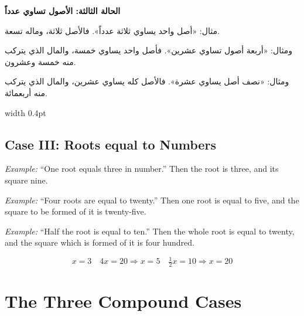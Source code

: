 \documentclass[11pt,a4paper]{book}
\begin{document}
\noindent\begin{minipage}[t]{0.48\textwidth}
\raggedleft

\begin{Arabic}
\textbf{الحالة الثالثة: الأصول تساوي عدداً}

مثال: «أصل واحد يساوي ثلاثة عدداً». فالأصل ثلاثة، وماله تسعة.

ومثال: «أربعة أصول تساوي عشرين». فأصل واحد يساوي خمسة، والمال الذي يتركب منه خمسة وعشرون.

ومثال: «نصف أصل يساوي عشرة». فالأصل كله يساوي عشرين، والمال الذي يتركب منه أربعمائة.
\end{Arabic}

\end{minipage}%
\hfill\vrule width 0.4pt\hfill
\begin{minipage}[t]{0.48\textwidth}
\raggedright

\subsection*{Case III: Roots equal to Numbers}

\textit{Example:} ``One root equals three in number.'' Then the root is three, and its square nine.

\textit{Example:} ``Four roots are equal to twenty.'' Then one root is equal to five, and the square to be formed of it is twenty-five.

\textit{Example:} ``Half the root is equal to ten.'' Then the whole root is equal to twenty, and the square which is formed of it is four hundred.

\begin{equation}
\boxed{x = 3} \quad
\boxed{4x = 20 \Rightarrow x = 5} \quad
\boxed{\tfrac{1}{2}x = 10 \Rightarrow x = 20}
\end{equation}

\end{minipage}
\vspace{0.3cm}

\newpage

\section{The Three Compound Cases}
\end{document}

